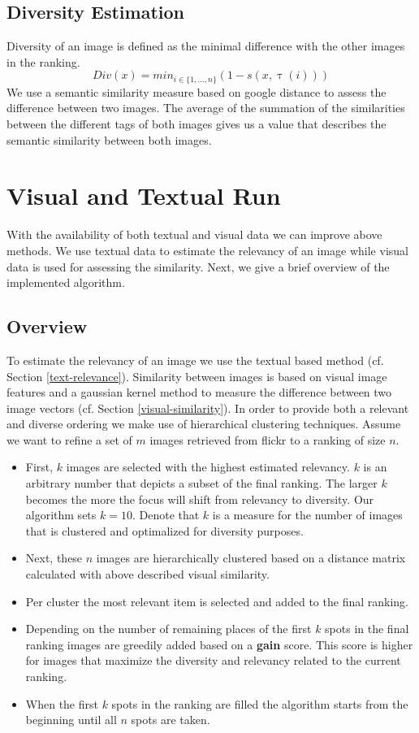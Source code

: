 \documentclass{acm_proc_article-me11_tweaked}
\begin{document}
\subsection{Diversity Estimation}
Diversity of an image is defined as the minimal difference with the other images in the ranking.
$$Div(x) = min_{i \in \{1,\ldots,n\}}\left( 1 - s(x, \uptau(i))\right)$$
We use a semantic similarity measure based on google distance \cite{google-distance} to assess the difference between two images.
The average of the summation of the similarities between the different tags of both images gives us a value that describes the semantic similarity between both images.


\section{Visual and Textual Run}
With the availability of both textual and visual data we can improve above methods.
We use textual data to estimate the relevancy of an image while visual data is used for assessing the similarity.
Next, we give a brief overview of the implemented algorithm.
\subsection{Overview}
To estimate the relevancy of an image we use the textual based method (cf. Section \ref{text-relevance}).
Similarity between images is based on visual image features and a gaussian kernel method to measure the difference between two image vectors (cf. Section \ref{visual-similarity}).
In order to provide both a relevant and diverse ordering we make use of hierarchical clustering techniques.
Assume we want to refine a set of $m$ images retrieved from flickr to a ranking of size $n$.
\begin{itemize}
 \item First, $k$ images are selected with the highest estimated relevancy. $k$ is an arbitrary number that depicts a subset of the final ranking. 
 The larger $k$ becomes the more the focus will shift from relevancy to diversity. Our algorithm sets $k = 10$. Denote that $k$ is a measure for the number of images that is clustered and optimalized for diversity purposes.
 \item Next, these $n$ images are hierarchically clustered based on a distance matrix calculated with above described visual similarity.
 \item Per cluster the most relevant item is selected and added to the final ranking.
 \item Depending on the number of remaining places of the first $k$ spots in the final ranking images are greedily added based on a \textbf{gain} score.
 This score is higher for images that maximize the diversity and relevancy related to the current ranking.
 \item When the first $k$ spots in the ranking are filled the algorithm starts from the beginning until all $n$ spots are taken.
 
\end{itemize}
\end{document}
